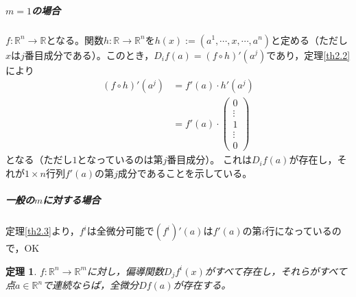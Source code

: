 \documentclass[dvipdfmx,a4j,10pt]{jsarticle}
\makeatletter
\theoremstyle{mystyle1}
\newtheorem{thm}[dfn]{定理}
\theoremstyle{mystyle2}
\renewenvironment{proof}[1][\proofname]{\par
  \pushQED{\qed}%
  \normalfont
  \topsep6\p@\@plus6\p@ \trivlist
  \item[\hskip\labelsep{\bfseries\sffamily #1}]\ignorespaces
}{%
  \popQED\endtrivlist\@endpefalse
}
\renewcommand\proofname{証明}
\makeatother
\begin{document}
\begin{proof}
	\subparagraph{$m=1$の場合}
	$f:\mathbb{R}^n\to\mathbb{R}$となる。関数$h:\mathbb{R}\to\mathbb{R}^n$を$h(x):=(a^1,\cdots,x,\cdots,a^n)$と定める（ただし$x$は$j$番目成分である）。このとき，$D_if(a)=(f\circ h)'(a^j)$であり，定理\ref{th2.2}により
	\[
	\begin{split}
	(f\circ h)'(a^j)&=f'(a)\cdot h'(a^j)\\
	&=f'(a)\cdot\begin{pmatrix} 0 \\ \vdots \\ 1 \\ \vdots \\ 0\end{pmatrix}
	\end{split}
	\]
	となる（ただし$1$となっているのは第$j$番目成分）。
	これは$D_if(a)$が存在し，それが$1\times n$行列$f'(a)$の第$j$成分であることを示している。\footnotemark
	\subparagraph{一般の$m$に対する場合}
	定理\ref{th2.3}より，$f^i$は全微分可能で$(f^i)'(a)$\footnotemark は$f'(a)$の第$i$行になっているので，OK
\end{proof}

\newpage

\begin{framed}
	\begin{thm}\label{th2.8}
		$f:\mathbb{R}^n\to\mathbb{R}^m$に対し，偏導関数$D_jf^i(x)$がすべて存在し，それらがすべて点$a\in\mathbb{R}^n$で連続ならば，全微分$Df(a)$が存在する。
	\end{thm}
\end{framed}
\end{document}
